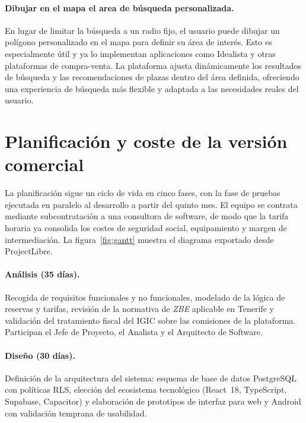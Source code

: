 \paragraph{Dibujar en el mapa el area de búsqueda personalizada.}
En lugar de limitar la búsqueda a un radio fijo, el usuario puede dibujar un polígono personalizado en el mapa para definir su área de interés. Esto es especialmente útil y ya lo implementan aplicaciones como Idealista y otras plataformas de compra-venta. La plataforma ajusta dinámicamente los resultados de búsqueda y las recomendaciones de plazas dentro del área definida, ofreciendo una experiencia de búsqueda más flexible y adaptada a las necesidades reales del usuario.

\section{Planificación y coste de la versión comercial}
\label{sec:desarrollo_proyecto}

La planificación sigue un ciclo de vida en cinco fases, con la fase de pruebas ejecutada en paralelo al desarrollo a partir del quinto mes. El equipo se contrata mediante subcontratación a una consultora de software, de modo que la tarifa horaria ya consolida los costes de seguridad social, equipamiento y margen de intermediación. La figura~\ref{fig:gantt} muestra el diagrama exportado desde ProjectLibre.

\paragraph{Análisis (35 días).}
Recogida de requisitos funcionales y no funcionales, modelado de la lógica de reservas y tarifas, revisión de la normativa de \textit{ZBE} aplicable en Tenerife y validación del tratamiento fiscal del IGIC sobre las comisiones de la plataforma. Participan el Jefe de Proyecto, el Analista y el Arquitecto de Software.

\paragraph{Diseño (30 días).}
Definición de la arquitectura del sistema: esquema de base de datos PostgreSQL con políticas RLS, elección del ecosistema tecnológico (React~18, TypeScript, Supabase, Capacitor) y elaboración de prototipos de interfaz para web y Android con validación temprana de usabilidad.

